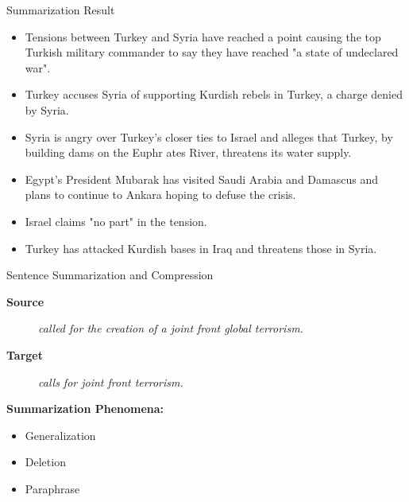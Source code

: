 \documentclass{beamer}
\begin{document}
\begin{frame}{Summarization Result}

  \begin{itemize}
  \item 

  Tensions between Turkey and Syria have reached a point causing the top Turkish military commander to say 
they have reached "a state of undeclared war".                                                          

  \item Turkey accuses Syria of supporting Kurdish rebels in Turkey, a charge denied by Syria.

  \item Syria is angry over Turkey's closer ties to Israel and alleges that Turkey, by building dams on the Euphr
ates River, threatens its water supply.
                                                                 
  \item Egypt's President Mubarak has visited Saudi Arabia and Damascus and plans to continue to Ankara hoping to
 defuse the crisis. 
                                                                                     
  \item Israel claims "no part" in the tension. 

  \item  Turkey has attacked Kurdish bases in Iraq and threatens those in Syria.
  \end{itemize}
\end{frame}


\begin{frame}{Sentence Summarization and Compression}
  \begin{center}
    \textbf{Source}
  \end{center}
    
  \begin{figure}
    \textit{
      called  for the creation of
      a joint front  global terrorism. }
  \end{figure}

  \begin{center}
    \textbf{Target}
  \end{center}

  \begin{figure}
    \centering
    \textit{ calls for joint
      front  terrorism.}
  \end{figure}

\air
\air

\textbf{Summarization Phenomena:} 

\begin{itemize}
\item<2-> \alert<2>{Generalization}
\item<3-> \alert<3>{Deletion}
\item<4-> \alert<4>{Paraphrase}
\end{itemize}
\end{frame}
\end{document}

